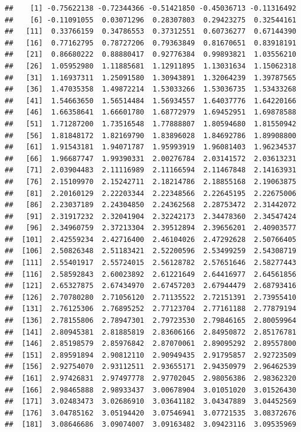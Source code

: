 \documentclass[
  11pt]{report}
\begin{document}
\begin{itemize}
\begin{verbatim}
##    [1] -0.75622138 -0.72344366 -0.51421850 -0.45036713 -0.11316492
##    [6] -0.11091055  0.03071296  0.28307803  0.29423275  0.32544161
##   [11]  0.33766159  0.34786553  0.37312551  0.60736277  0.67144390
##   [16]  0.77162795  0.78727206  0.79363849  0.81670651  0.83918191
##   [21]  0.86680222  0.88880417  0.92776384  0.99893821  1.03556210
##   [26]  1.05952980  1.11885681  1.12911895  1.13031634  1.15062318
##   [31]  1.16937311  1.25091580  1.30943891  1.32064239  1.39787565
##   [36]  1.47035358  1.49872214  1.53033266  1.53036735  1.53433268
##   [41]  1.54663650  1.56514484  1.56934557  1.64037776  1.64220166
##   [46]  1.66358641  1.66601780  1.68772979  1.69452951  1.69878588
##   [51]  1.71287200  1.73516548  1.77888807  1.80594680  1.81550942
##   [56]  1.81848172  1.82169790  1.83896028  1.84692786  1.89908800
##   [61]  1.91543181  1.94071787  1.95993919  1.96081403  1.96234537
##   [66]  1.96687747  1.99390331  2.00276784  2.03141572  2.03613231
##   [71]  2.03904483  2.11116989  2.11166594  2.11467848  2.14163931
##   [76]  2.15109970  2.15242711  2.18214786  2.18855168  2.19063875
##   [81]  2.20160129  2.22203344  2.22348566  2.22645195  2.22675006
##   [86]  2.23037189  2.24304850  2.24362568  2.28753472  2.31442072
##   [91]  2.31917232  2.32041904  2.32242173  2.34478360  2.34547424
##   [96]  2.34960759  2.37213304  2.39512894  2.39656201  2.40903577
##  [101]  2.42559234  2.42716400  2.46104026  2.47292628  2.50766405
##  [106]  2.50826348  2.51183421  2.52200596  2.53499259  2.54308719
##  [111]  2.55401917  2.55724015  2.56128782  2.57651646  2.58277443
##  [116]  2.58592843  2.60023892  2.61221649  2.64416977  2.64561856
##  [121]  2.65327875  2.67434970  2.67457203  2.67944479  2.68793416
##  [126]  2.70780280  2.71056120  2.71135522  2.72151391  2.73955410
##  [131]  2.76125306  2.76895252  2.77123704  2.77161188  2.77879194
##  [136]  2.78155806  2.78947301  2.79723530  2.79846165  2.80059964
##  [141]  2.80945381  2.81885819  2.83606166  2.84950872  2.85176781
##  [146]  2.85198579  2.85976842  2.87070061  2.89095292  2.89557800
##  [151]  2.89591894  2.90812110  2.90949435  2.91795857  2.92723509
##  [156]  2.92754070  2.93112511  2.93655171  2.94350979  2.96462539
##  [161]  2.97426831  2.97497778  2.97702045  2.98056386  2.98362320
##  [166]  2.98465888  2.98933437  3.00678904  3.01051020  3.01526430
##  [171]  3.02483473  3.02686910  3.03641182  3.04347889  3.04452569
##  [176]  3.04785162  3.05194420  3.07546941  3.07721535  3.08372676
##  [181]  3.08646686  3.09074007  3.09163482  3.09423116  3.09535969

\end{verbatim}
\end{itemize}
\end{document}
